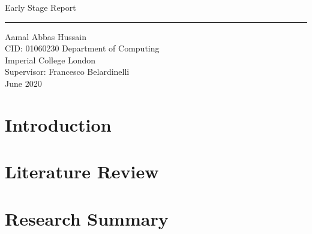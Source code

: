 \documentclass[11pt]{report}
\begin{document}
\clearpage\thispagestyle{empty}
\begin{titlepage}

	\flushright
    \hfill
    \vfill
	{\Huge Early Stage Report \par} 
	\rule[5pt]{\textwidth}{.4pt} \par
	{\Large Aamal Abbas Hussain \\ CID: 01060230}
	\vfill 
    {\Large Department of Computing\\Imperial College London\\Supervisor: Francesco Belardinelli\\
	June 2020 \\}
\end{titlepage}



\tableofcontents

\chapter{Introduction}  \label{ch::Intro}

\chapter{Literature Review}  \label{ch::Lit_Review}

\chapter{Research Summary}  \label{ch::ShortTermGoals}
\end{document}
